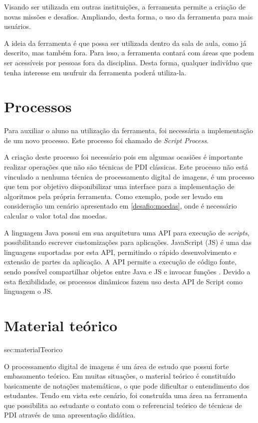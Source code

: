 \documentclass[
	12pt,				%
	oneside,			%
	a4paper,			%
	english,			%
	french,				%
	spanish,			%
	brazil,				%
	]{abntex2}
\begin{document}
Visando ser utilizada em outras instituições, a ferramenta permite a criação de novas missões e desafios. Ampliando, desta forma, o uso da ferramenta para mais usuários.

A ideia da ferramenta é que possa ser utilizada dentro da sala de aula, como já descrito, mas também fora. Para isso, a ferramenta contará com áreas que podem ser acessíveis por pessoas fora da disciplina. Desta forma, qualquer indivíduo que tenha interesse em usufruir da ferramenta poderá utiliza-la.

\section{Processos}
\label{sec:processos}

Para auxiliar o aluno na utilização da ferramenta, foi necessária a implementação de um novo processo. Este processo foi chamado de \textit{Script Process}.

A criação deste processo foi necessário pois em algumas ocasiões é importante realizar operações que não são técnicas de PDI clássicas. Este processo não está vinculado a nenhuma técnica de processamento digital de imagens, é um processo que tem por objetivo disponibilizar uma interface para a implementação de algoritmos pela própria ferramenta. Como exemplo, pode ser levado em consideração um cenário apresentado em \ref{desafio:moedas}, onde é necessário calcular o valor total das moedas.

A linguagem Java possui em sua arquitetura uma API para execução de \textit{scripts}, possibilitando escrever customizações para aplicações. JavaScript (JS) é uma das linguagens suportadas por esta API, permitindo o rápido desenvolvimento e extensão de partes da aplicação. A API permite a execução de código fonte, sendo possível compartilhar objetos entre Java e JS e invocar funções \cite{oracle}. Devido a esta flexibilidade, os processos dinâmicos fazem uso desta API de Script como linguagem o JS. 

\section{Material teórico}
{sec:materialTeorico}

O processamento digital de imagens é um área de estudo que possui forte embasamento teórico. Em muitas situações, o material teórico é constituído basicamente de notações matemáticas, o que pode dificultar o entendimento dos estudantes. Tendo em vista este cenário, foi construída uma área na ferramenta que possibilita ao estudante o contato com o referencial teórico de técnicas de PDI através de uma apresentação didática.
\end{document}
